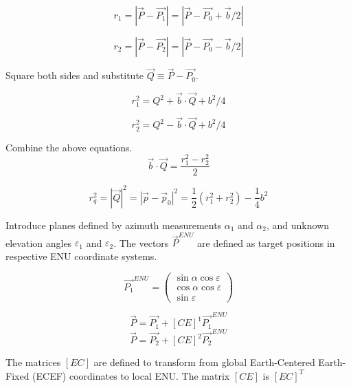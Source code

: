 \documentclass[12pt]{article}
\begin{document}
	\begin{equation}
		r_1 = |\vec{P} - \vec{P_1}| = |\vec{P} - \vec{P_0} + \vec{b}/2|
	\end{equation}
	
	\begin{equation}
		r_2 = |\vec{P} - \vec{P_2}| = |\vec{P} - \vec{P_0} - \vec{b}/2|
	\end{equation}

	Square both sides and substitute $\vec{Q} \equiv \vec{P} - \vec{P_0}$.
	
	\begin{equation}
		r_1^2 = Q^2 + \vec{b} \cdot \vec{Q} + b^2/4
	\end{equation}

	\begin{equation}
		r_2^2 = Q^2 - \vec{b} \cdot \vec{Q} + b^2/4
	\end{equation}
	
	Combine the above equations.
	\begin{equation}
		\vec{b} \cdot \vec{Q}=\frac{r_1^2-r_2^2}{2}
	\end{equation}
	
	\begin{equation}
		r_q^2=|\vec{Q}|^2=\left|\vec{p}-\vec{p}_0\right|^2=\frac{1}{2}\left(r_1^2+r_2^2\right)-\frac{1}{4} b^2
	\end{equation}	
	
	Introduce planes defined by azimuth measurements $\alpha_1$  and $\alpha_2$, and unknown elevation angles
	$\varepsilon_1$  and $\varepsilon_2$. The vectors $\vec{P}^{ENU}$ are defined as target positions in respective ENU
	coordinate systems.
	
	\begin{equation}
		\vec{P_1}^{ENU} = \left(\begin{array}{c}
			\sin\alpha \cos\varepsilon \\
			\cos\alpha \cos\varepsilon \\
			\sin\varepsilon
			\end{array}\right)
	\end{equation}	
	
	\begin{equation}
		\vec{P} = \vec{P_1} + [CE]^1 \vec{P_1}^{ENU}
	\end{equation}	
	\begin{equation}
		\vec{P} = \vec{P_2} + [CE]^2 \vec{P_2}^{ENU}
	\end{equation}

	The matrices $[EC]$ are defined to transform from global Earth-Centered Earth-Fixed (ECEF) coordinates to local
	ENU. The matrix $[CE]$ is $[EC]^T$
\end{document}
